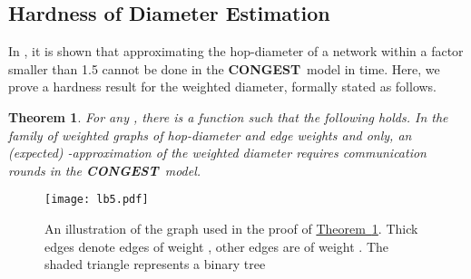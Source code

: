 \documentclass[letterpaper,11pt]{article}
\newcommand{\namedref}[2]{\hyperref[#2]{#1~\ref*{#2}}}
\newcommand{\theoremref}[1]{\namedref{Theorem}{#1}}
\newtheorem{theorem}{Theorem}[section]
\newcommand{\CONGEST}{\textbf{CONGEST}}
\begin{document}
\subsection{Hardness of Diameter Estimation}
\label{sec:lb_diam}

In \cite{FHW-12}, it is shown that approximating the hop-diameter of a
network within a factor smaller than 1.5 cannot be done in the \CONGEST\ model
in  time. Here, we prove a hardness result for the weighted
diameter, formally stated as follows.
\begin{theorem}\label{thm-lb-diam}
For any , there is a function  such that the following holds. In the family of
weighted graphs of hop-diameter  and edge weights  and
 only, an (expected) -approximation of the weighted
diameter requires  communication rounds in the \CONGEST\
model.
\end{theorem}
\begin{figure}[t]
  \centering \texttt{[image: lb5.pdf]} \caption{An
    illustration of  the graph
  used in the proof of
    \theoremref{thm-lb-diam}. Thick edges denote edges of weight
    , other edges are of weight . The shaded
    triangle represents a binary tree}
  \label{fig-lb5}
\end{figure}
\end{document}
